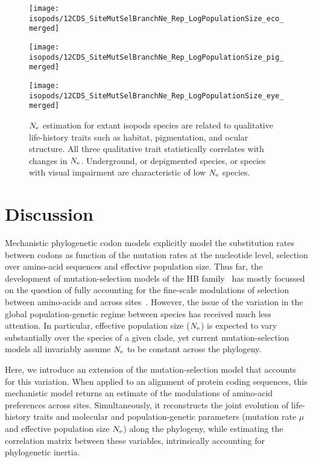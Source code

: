 \begin{figure}[htbp]
    \centering
    \begin{minipage}{0.32\linewidth}
        \texttt{[image: isopods/12CDS\_SiteMutSelBranchNe\_Rep\_LogPopulationSize\_eco\_merged]}
    \end{minipage} \hfill
    \begin{minipage}{0.32\linewidth}
        \texttt{[image: isopods/12CDS\_SiteMutSelBranchNe\_Rep\_LogPopulationSize\_pig\_merged]}
    \end{minipage} \hfill
    \begin{minipage}{0.32\linewidth}
        \texttt{[image: isopods/12CDS\_SiteMutSelBranchNe\_Rep\_LogPopulationSize\_eye\_merged]}
    \end{minipage}
    \caption[$\Ne$ as a function of traits in isopods]{
    $\Ne$ estimation for extant isopods species are related to qualitative life-history traits such as habitat, pigmentation, and ocular structure.
    All three qualitative trait statistically correlates with changes in $\Ne$.
    Underground, or depigmented species, or species with visual impairment are characteristic of low $\Ne$ species.}
    \label{fig:isopods_correlation}
\end{figure}


\section{Discussion}
\label{sec:Discussion}
Mechanistic phylogenetic codon models explicitly model the substitution rates between codons as function of the mutation rates at the nucleotide level, selection over amino-acid sequences and effective population size.
Thus far, the development of mutation-selection models of the HB family~\citep{Rodrigue2010, Tamuri2012} has mostly focussed on the question of fully accounting for the fine-scale modulations of selection between amino-acids and across sites~\citep{Rodrigue2010, Tamuri2012}.
However, the issue of the variation in the global population-genetic regime between species has received much less attention.
In particular, effective population size ($\Ne$) is expected to vary substantially over the species of a given clade, yet current mutation-selection models all invariably assume $\Ne$ to be constant across the phylogeny.

Here, we introduce an extension of the mutation-selection model that accounts for this variation.
When applied to an alignment of protein coding sequences, this mechanistic model returns an estimate of the modulations of amino-acid preferences across sites.
Simultaneously, it reconstructs the joint evolution of life-history traits and molecular and population-genetic parameters (mutation rate $\mu$ and effective population size $\Ne$) along the phylogeny, while estimating the correlation matrix between these variables, intrinsically accounting for phylogenetic inertia.


